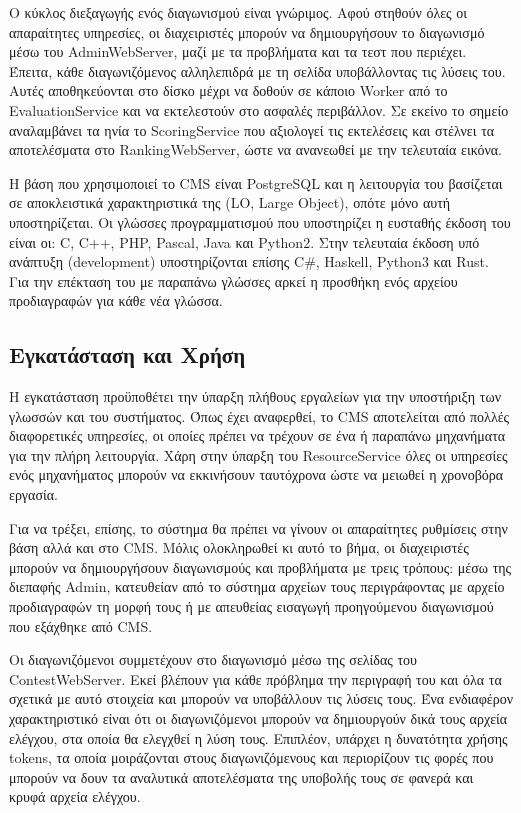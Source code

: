 \documentclass[diploma]{softlab-thesis}
\begin{document}
\bigskip

Ο κύκλος διεξαγωγής ενός διαγωνισμού είναι γνώριμος. Αφού στηθούν όλες οι
απαραίτητες υπηρεσίες, οι διαχειριστές μπορούν να δημιουργήσουν το διαγωνισμό
μέσω του AdminWebServer, μαζί με τα προβλήματα και τα τεστ που περιέχει.
Έπειτα, κάθε διαγωνιζόμενος αλληλεπιδρά με τη σελίδα υποβάλλοντας τις λύσεις
του. Αυτές αποθηκεύονται στο δίσκο μέχρι να δοθούν σε κάποιο Worker από το
EvaluationService και να εκτελεστούν στο ασφαλές περιβάλλον. Σε εκείνο το
σημείο αναλαμβάνει τα ηνία το ScoringService που αξιολογεί τις εκτελέσεις και
στέλνει τα αποτελέσματα στο RankingWebServer, ώστε να ανανεωθεί με την
τελευταία εικόνα.

\bigskip

Η βάση που χρησιμοποιεί το CMS είναι PostgreSQL και η λειτουργία του βασίζεται
σε αποκλειστικά χαρακτηριστικά της (LO, Large Object), οπότε μόνο αυτή
υποστηρίζεται. Οι γλώσσες προγραμματισμού που υποστηρίζει η ευσταθής έκδοση του
είναι οι: C, C++, PHP, Pascal, Java και Python2. Στην τελευταία έκδοση υπό
ανάπτυξη (development) υποστηρίζονται επίσης C\#, Haskell, Python3 και Rust.
Για την επέκταση του με παραπάνω γλώσσες αρκεί η προσθήκη ενός αρχείου
προδιαγραφών για κάθε νέα γλώσσα.

\subsection{Εγκατάσταση και Χρήση}

Η εγκατάσταση προϋποθέτει την ύπαρξη πλήθους εργαλείων για την υποστήριξη των
γλωσσών και του συστήματος. Όπως έχει αναφερθεί, το CMS αποτελείται από πολλές
διαφορετικές υπηρεσίες, οι οποίες πρέπει να τρέχουν σε ένα ή παραπάνω μηχανήματα
για την πλήρη λειτουργία. Χάρη στην ύπαρξη του ResourceService όλες οι υπηρεσίες
ενός μηχανήματος μπορούν να εκκινήσουν ταυτόχρονα ώστε να μειωθεί η χρονοβόρα
εργασία.

\bigskip

Για να τρέξει, επίσης, το σύστημα θα πρέπει να γίνουν οι απαραίτητες ρυθμίσεις
στην βάση αλλά και στο CMS. Μόλις ολοκληρωθεί κι αυτό το βήμα, οι διαχειριστές
μπορούν να δημιουργήσουν διαγωνισμούς και προβλήματα με τρεις τρόπους: μέσω της
διεπαφής Admin, κατευθείαν από το σύστημα αρχείων τους περιγράφοντας με αρχείο
προδιαγραφών τη μορφή τους ή με απευθείας εισαγωγή προηγούμενου διαγωνισμού που
εξάχθηκε από CMS.

\bigskip

Οι διαγωνιζόμενοι συμμετέχουν στο διαγωνισμό μέσω της σελίδας του
ContestWebServer. Εκεί βλέπουν για κάθε πρόβλημα την περιγραφή του και όλα
τα σχετικά με αυτό στοιχεία και μπορούν να υποβάλλουν τις λύσεις τους. Ένα
ενδιαφέρον χαρακτηριστικό είναι ότι οι διαγωνιζόμενοι μπορούν να δημιουργούν
δικά τους αρχεία ελέγχου, στα οποία θα ελεγχθεί η λύση τους. Επιπλέον, υπάρχει
η δυνατότητα χρήσης tokens, τα οποία μοιράζονται στους διαγωνιζόμενους και
περιορίζουν τις φορές που μπορούν να δουν τα αναλυτικά αποτελέσματα της
υποβολής τους σε φανερά και κρυφά αρχεία ελέγχου.
\end{document}
